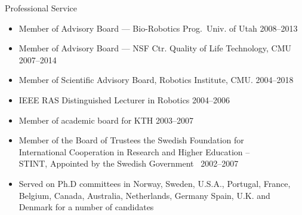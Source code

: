 \documentclass{article}
\begin{document}
\begin{cv}
\begin{cvlist}{Professional Service}
\begin{itemize}
    \item Member of Advisory Board --- Bio-Robotics Prog.\ Univ. of Utah
          \cftdotfill{\cftdotsep} 2008--2013
    \item Member of Advisory Board --- NSF Ctr. Quality of Life Technology, CMU
          \cftdotfill{\cftdotsep} 2007--2014
    \item Member of Scientific Advisory Board, Robotics Institute, CMU.\@
          \cftdotfill{\cftdotsep} 2004--2018
    \item IEEE RAS Distinguished Lecturer in Robotics \cftdotfill{\cftdotsep}
          2004--2006
    \item Member of academic board for KTH \cftdotfill{\cftdotsep} 2003--2007
    \item Member of the Board of Trustees the Swedish Foundation for\\
      International Cooperation in Research and Higher Education --\\
          STINT, Appointed by the Swedish Government\ \cftdotfill{\cftdotsep}
          2002--2007
    \item Served on Ph.D committees in Norway, Sweden, U.S.A., Portugal, France,
          Belgium, Canada, Australia, Netherlands, Germany Spain, U.K. and
          Denmark for a number of candidates
  \end{itemize}


\end{cvlist}
\end{cv}
\end{document}

